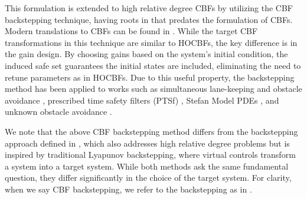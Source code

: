 \documentclass[letterpaper, 10 pt, conference]{ieeeconf}
\begin{document}
{This formulation is extended to high relative degree CBFs by utilizing the CBF backstepping technique, having roots in \cite{krstic_nonovershooting_2006} that predates the formulation of CBFs. Modern translations to CBFs can be found in \cite{abel2023prescribed_time,koga_safe_2023,kim2024robustcontrolbarrierfunction}. While the target CBF transformations in this technique are similar to HOCBFs, the key difference is in the gain design. By choosing gains based on the system's initial condition, the induced safe set guarantees the initial states are included, eliminating the need to retune parameters as in HOCBFs. Due to this useful property, the backstepping method has been applied to works such as simultaneous lane-keeping and obstacle avoidance \cite{drew_brugg_sim_LK}, prescribed time safety filters (PTSf) \cite{abel2023prescribed_time}, Stefan Model PDEs \cite{koga_safe_2023,koga2023event}, and unknown obstacle avoidance \cite{kim2024robustcontrolbarrierfunction}.

We note that the above CBF backstepping method differs from the backstepping approach defined in \cite{taylor_safe_2022}, which also addresses high relative degree problems but is inspired by traditional Lyapunov backstepping, where virtual controls transform a system into a target system. While both methods ask the same fundamental question, they differ significantly in the choice of the target system. For clarity, when we say CBF backstepping, we refer to the backstepping as in \cite{krstic_nonovershooting_2006}.



}
\end{document}
